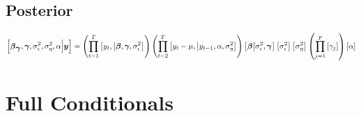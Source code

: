 \documentclass[fleqn]{article}
\def\bm#1{\mbox{\boldmath $#1$}}
\begin{document}
\subsection{Posterior}
%
\begin{align*}
%
\left[ \bm{\beta}_{\bm{\gamma}}, \bm{\gamma}, \sigma^2_\epsilon, \sigma^2_\eta, \alpha \middle| \bm{y} \right] & = \left(\prod_{t = 1}^T \left[ y_t, \middle| \bm{\beta}, \bm{\gamma}, \sigma^2_\epsilon \right] \right) \left(\prod_{t = 2}^T \left[ y_t - \mu, \middle| y_{t - 1}, \alpha, \sigma^2_\eta \right] \right) \left[ \bm{\beta} \middle| \sigma^2_\epsilon, \bm{\gamma} \right] \left[ \sigma^2_\epsilon \right] \left[ \sigma^2_\eta \right] \left( \prod_{j = 1}^p \left[ \gamma_j \right] \right) \left[ \alpha \right]\\
%
\end{align*}
%
\section{Full Conditionals}
\end{document}
